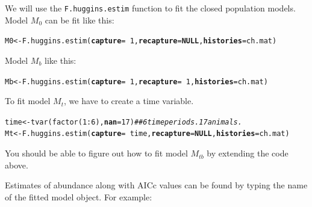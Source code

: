 \documentclass[12pt]{article}\usepackage[]{graphicx}\usepackage[]{color}
\makeatletter
\newcommand{\hlnum}[1]{\textcolor[rgb]{0.69,0.494,0}{#1}}%
\newcommand{\hlcom}[1]{\textcolor[rgb]{0.514,0.506,0.514}{\textit{#1}}}%
\newcommand{\hlopt}[1]{\textcolor[rgb]{0,0,0}{#1}}%
\newcommand{\hlstd}[1]{\textcolor[rgb]{0,0,0}{#1}}%
\newcommand{\hlkwa}[1]{\textcolor[rgb]{0,0,0}{\textbf{#1}}}%
\newcommand{\hlkwb}[1]{\textcolor[rgb]{0,0.341,0.682}{#1}}%
\newcommand{\hlkwc}[1]{\textcolor[rgb]{0,0,0}{\textbf{#1}}}%
\newcommand{\hlkwd}[1]{\textcolor[rgb]{0.004,0.004,0.506}{#1}}%
\newenvironment{kframe}{%
 \def\at@end@of@kframe{}%
 \ifinner\ifhmode%
  \def\at@end@of@kframe{\end{minipage}}%
  \begin{minipage}{\columnwidth}%
 \fi\fi%
 \def\FrameCommand##1{\hskip\@totalleftmargin \hskip-\fboxsep
 \colorbox{shadecolor}{##1}\hskip-\fboxsep
     \hskip-\linewidth \hskip-\@totalleftmargin \hskip\columnwidth}%
 \MakeFramed {\advance\hsize-\width
   \@totalleftmargin\z@ \linewidth\hsize
   \@setminipage}}%
 {\par\unskip\endMakeFramed%
 \at@end@of@kframe}
\newenvironment{knitrout}{}{} %
\newcommand{\inr}[1]{\colorbox{inlinecolor}{\texttt{#1}}}
\makeatother
\begin{document}
We will use the \inr{F.huggins.estim} function to fit the
closed population models. Model $M_0$ can be fit like this: 

\begin{knitrout}
\color{fgcolor}\begin{kframe}
\begin{alltt}
\hlstd{M0} \hlkwb{<-} \hlkwd{F.huggins.estim}\hlstd{(}\hlkwc{capture}\hlstd{=}\hlopt{~}\hlnum{1}\hlstd{,} \hlkwc{recapture}\hlstd{=}\hlkwa{NULL}\hlstd{,} \hlkwc{histories}\hlstd{=ch.mat)}
\end{alltt}
\end{kframe}
\end{knitrout}

Model $M_b$ like this:

\begin{knitrout}
\color{fgcolor}\begin{kframe}
\begin{alltt}
\hlstd{Mb} \hlkwb{<-} \hlkwd{F.huggins.estim}\hlstd{(}\hlkwc{capture}\hlstd{=}\hlopt{~}\hlnum{1}\hlstd{,} \hlkwc{recapture}\hlstd{=}\hlopt{~}\hlnum{1}\hlstd{,} \hlkwc{histories}\hlstd{=ch.mat)}
\end{alltt}
\end{kframe}
\end{knitrout}

To fit model $M_t$, we have to create a time variable.

\begin{knitrout}
\color{fgcolor}\begin{kframe}
\begin{alltt}
\hlstd{time} \hlkwb{<-} \hlkwd{tvar}\hlstd{(}\hlkwd{factor}\hlstd{(}\hlnum{1}\hlopt{:}\hlnum{6}\hlstd{),} \hlkwc{nan}\hlstd{=}\hlnum{17}\hlstd{)} \hlcom{## 6 time periods. 17 animals.}
\hlstd{Mt} \hlkwb{<-} \hlkwd{F.huggins.estim}\hlstd{(}\hlkwc{capture}\hlstd{=}\hlopt{~}\hlstd{time,} \hlkwc{recapture}\hlstd{=}\hlkwa{NULL}\hlstd{,} \hlkwc{histories}\hlstd{=ch.mat)}
\end{alltt}
\end{kframe}
\end{knitrout}


You should be able to figure out how to fit model $M_{tb}$ by
extending the code above.

Estimates of abundance along with AICc values can be found by typing
the name of the fitted model object. For example:
\end{document}

